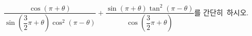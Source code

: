 $\dfrac{\cos(\pi+\theta)}{\sin\left(\dfrac{3}{2}\pi+\theta\right)\cos^2(\pi-\theta)}+\dfrac{\sin(\pi+\theta)\tan^2(\pi-\theta)}{\cos\left(\dfrac{3}{2}\pi+\theta\right)}$를 \mbox{간단히 하시오.}
